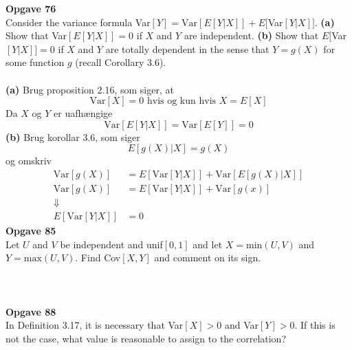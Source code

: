\documentclass[12pt,a4paper,draft]{report}
\author{Frederik Appel Vardinghus-Nielsen}
\begin{document}
\noindent\textbf{Opgave 76}\\
Consider the variance formula Var$[Y]=\text{Var}[E[Y|X]]+E[$Var$[Y|X]]$. \textbf{(a)} Show that Var$[E[Y|X]]=0$ if $X$ and $Y$ are independent. \textbf{(b)} Show that $E[$Var$[Y|X]]=0$ if $X$ and $Y$ are totally dependent in the sense that $Y=g(X)$ for some function $g$ (recall Corollary 3.6).\\\\
\textbf{(a)} Brug proposition 2.16, som siger, at
\begin{equation}
\text{Var}[X]=0\text{ hvis og kun hvis } X=E[X]
\end{equation}
Da $X$ og $Y$ er uafhængige
\begin{equation}
\text{Var}[E[Y|X]]=\text{Var}[E[Y]]=0
\end{equation}
\textbf{(b)} Brug korollar 3.6, som siger
\begin{equation}
E[g(X)|X]=g(X)
\end{equation}
og omskriv
\begin{align*}
\text{Var}[g(X)]&=E[\text{Var}[Y|X]]+\text{Var}[E[g(X)|X]]\\
\text{Var}[g(X)]&=E[\text{Var}[Y|X]]+\text{Var}[g(x)]\\
\Downarrow\\
E[\text{Var}[Y|X]]&=0
\end{align*}
\textbf{Opgave 85}\\
Let $U$ and $V$ be independent and unif$[0,1]$ and let $X=\mathrm{min}(U,V)$ and $Y=\mathrm{max}(U,V)$. Find Cov$[X,Y]$ and comment on its sign.\\\\


\\\\
\textbf{Opgave 88}\\
In Definition 3.17, it is necessary that Var$[X
]>0$ and Var$[Y]>0$. If this is not the case, what value is reasonable to assign to the correlation?
\end{document}
